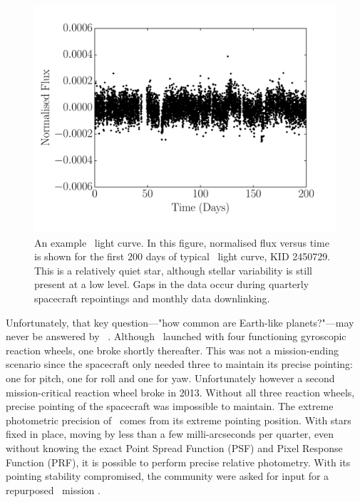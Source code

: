 \begin{figure}[p]
\begin{center}
\includegraphics[width=6in, clip=true]{figures/demo_kepler_lightcurve.pdf}
\caption[An example \kepler\ light curve.]
{An example \kepler\ light curve.
In this figure, normalised flux versus time is shown for the first 200 days
of typical \kepler\ light curve, KID 2450729.
This is a relatively quiet star, although stellar variability is still present
at a low level.
Gaps in the data occur during quarterly spacecraft repointings and monthly
data downlinking.}
\label{fig:demo_kepler_lightcurve}
\end{center}
\end{figure}

Unfortunately, that key question---"how common are Earth-like planets?"---may
never be answered by \kepler\ \citep[or at least not very precisely. Several
inferences have been performed by extrapolation, \eg][]{Petigura2013,
Foreman-Mackey2014, Burke2015}.
Although \kepler\ launched with four functioning gyroscopic reaction wheels,
one broke shortly thereafter.
This was not a mission-ending scenario since the spacecraft only needed three
to maintain its precise pointing: one for pitch, one for roll and one for yaw.
Unfortunately however a second mission-critical reaction wheel
broke in 2013.
Without all three reaction wheels, precise pointing of the spacecraft was
impossible to maintain.
The extreme photometric precision of \kepler\ comes from its extreme pointing
position.
With stars fixed in place, moving by less than a few milli-arcseconds per
quarter, even without knowing the exact Point Spread Function (PSF) and Pixel
Response Function (PRF), it is possible to perform precise relative
photometry.
With its pointing stability compromised, the community were asked for input
for a repurposed \kepler\ mission \citep[\eg][]{Hogg2013, Aigrain2015}.

